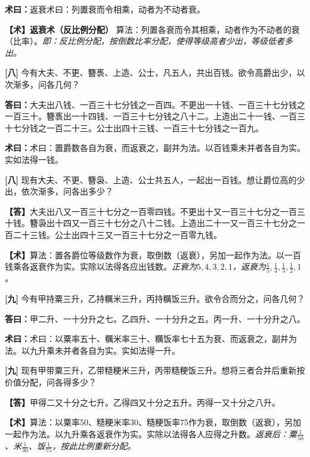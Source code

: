\documentclass[10pt,a4paper]{article}
\newlength{\lw}
\newlength{\rw}
\newcommand{\bilingc}[2]{%
  \par\vspace{0.1em}%
  \noindent\begin{minipage}[t]{\lw}
  {\small #1}
  \end{minipage}%
  \hfill%
  \begin{minipage}[t]{\rw}
  {\small #2}
  \end{minipage}%
  \vspace{0.1em}%
}
\newcommand{\da}{\textbf{\textcolor{answercolor}{答曰：}}}
\newcommand{\daB}{\textbf{\textcolor{answercolor}{【答】}}}
\newcommand{\shu}{\textbf{\textcolor{methodcolor}{术曰：}}}
\newcommand{\shuB}{\textbf{\textcolor{methodcolor}{【术】}}}
\newcommand{\pn}[1]{\textbf{[#1]}}
\begin{document}
\vspace{0.3em}

\bilingc{
\shu 返衰术曰：列置衰而令相乘，动者为不动者衰。
}{
\shuB \textbf{返衰术（反比例分配）} 算法：列置各衰而令其相乘，动者作为不动者的衰（比率）。\textit{即：反比例分配，按倒数比率分配，使得等级高者少出，等级低者多出。}
}

\vspace{0.3em}

\bilingc{
\pn{八} 今有大夫、不更、簪褭、上造、公士，凡五人，共出百钱。欲令高爵出少，以次渐多，问各几何？

\da 大夫出八钱、一百三十七分钱之一百四。不更出一十钱、一百三十七分钱之一百三十。簪褭出一十四钱、一百三十七分钱之八十二。上造出二十一钱、一百三十七分钱之一百二十三。公士出四十三钱、一百三十七分钱之一百九。

\shu 术曰：置爵数各自为衰，而返衰之，副并为法。以百钱乘未并者各自为实。实如法得一钱。
}{
\pn{八} 现有大夫、不更、簪袅、上造、公士共五人，一起出一百钱。想让爵位高的少出，依次渐多，问各出多少？

\daB 大夫出八又一百三十七分之一百零四钱。不更出十又一百三十七分之一百三十钱。簪袅出十四又一百三十七分之八十二钱。上造出二十一又一百三十七分之一百二十三钱。公士出四十三又一百三十七分之一百零九钱。

\shuB 算法：置各爵位等级数作为衰，取倒数（返衰），另加一起作为法。以一百钱乘各返衰作为实。实除以法得各应出钱数。\textit{正衰为$5,4,3,2,1$，返衰为$\frac15,\frac14,\frac13,\frac12,1$。}
}

\vspace{0.3em}

\bilingc{
\pn{九} 今有甲持粟三升，乙持糲米三升，丙持糲饭三升。欲令合而分之，问各几何？

\da 甲二升、一十分升之七。乙四升、一十分升之五。丙一升、一十分升之八。

\shu 术曰：以粟率五十、糲米率三十、糲饭率七十五为衰、而返衰之，副并为法。以九升乘未并者各自为实。实如法得一升。
}{
\pn{九} 现有甲带粟三升，乙带糙粳米三升，丙带糙粳饭三升。想将三者合并后重新按价值分配，问各得多少？

\daB 甲得二又十分之七升。乙得四又十分之五升。丙得一又十分之八升。

\shuB 算法：以粟率50、糙粳米率30、糙粳饭率75作为衰，取倒数（返衰），另加一起作为法。以九升乘各返衰作为实。实除以法得各人应得之升数。\textit{返衰后：粟$\frac{1}{50}$、米$\frac{1}{30}$、饭$\frac{1}{75}$，按此比例重新分配。}
}

\vspace{0.3em}
\end{document}
